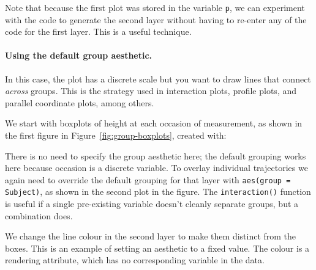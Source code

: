 % 


% 

 
Note that because the first plot was stored in the variable {\tt p}, we can experiment with the code to generate the second layer without having to re-enter any of the code for the first layer.  This is a useful technique.

\paragraph{Using the default group aesthetic.}  In this case, the plot has a discrete scale but you want to draw lines that connect {\em across} groups.  This is the strategy used in interaction plots, profile plots, and parallel coordinate plots, among others.  

We start with boxplots of height at each occasion of measurement, as shown in the first figure in Figure~\ref{fig:group-boxplots}, created with:

% 


\noindent There is no need to specify the group aesthetic here; the default grouping works here because occasion is a discrete variable.  To overlay individual trajectories we again need to override the default grouping for that layer with {\tt aes(group = Subject)}, as shown in the second plot in the figure.  The {\tt interaction()} function is useful if a single pre-existing variable doesn't cleanly separate groups, but a combination does.

% 


We change the line colour in the second layer to make them distinct from the boxes.  This is an example of setting an aesthetic to a fixed value.  The colour is a rendering attribute, which has no corresponding variable in the data.

